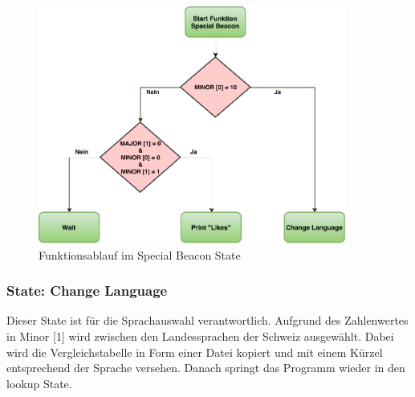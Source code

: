 \begin{figure}[htbp!!!!]
	\centering
	\includegraphics[width=0.9\textwidth]{Data/SpecialBeacon_picture.pdf}
	\caption[Statemachine: Special Beacon]{Funktionsablauf im Special Beacon State}
	\label{fig:specialBeaconState}
\end{figure} 
\newpage
\subsubsection*{State: Change Language}

Dieser State ist für die Sprachauswahl verantwortlich. Aufgrund des Zahlenwertes in Minor [1] wird zwischen den Landessprachen der Schweiz ausgewählt. Dabei wird die Vergleichstabelle in Form einer Datei kopiert und mit einem Kürzel entsprechend der Sprache versehen. Danach springt das Programm wieder in den lookup State.

